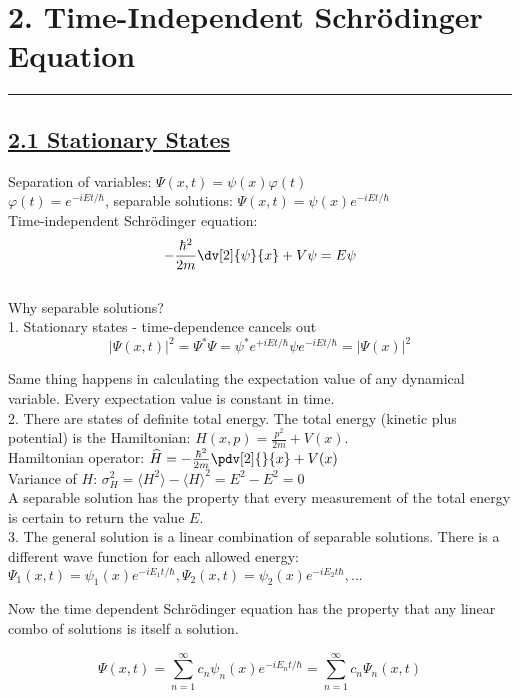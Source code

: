 \section{2. Time-Independent Schr\"{o}dinger Equation} \hrule height 0.3pt \thinspace

\subsection{\underline{2.1 Stationary States}}
Separation of variables: $\Psi(x, t) = \psi(x) \varphi(t)$ \\

$\varphi(t) = e^{-iEt/\hbar}$, separable solutions: $\Psi(x, t) = \psi(x) e^{-iEt / \hbar}$ \\

Time-independent Schr\"{o}dinger equation:
$$-\frac{\hbar^2 }{2m} \dv[2]{\psi}{x} + V \psi = E \psi $$ \\

Why separable solutions? \\
1. Stationary states - time-dependence cancels out
    $$|\Psi(x,t)|^2 = \Psi^* \Psi = \psi^* e^{+iEt/\hbar} \psi e^{-iEt/\hbar} = |\Psi(x)|^2$$

    Same thing happens in calculating the expectation value of any dynamical variable. Every expectation value is constant in time. \\

2. There are states of definite total energy. The total energy (kinetic plus potential) is the Hamiltonian: $H(x, p) = \frac{p^2}{2m} + V(x)$. \\

Hamiltonian operator: $\widehat{H} = -\frac{\hbar^2}{2m} \pdv[2]{}{x} + V(x)$ \\
Variance of $H$: $\sigma_{H}^2 = \langle H^2 \rangle - \langle H \rangle ^2 = E^2 - E^2 = 0$ \\
A separable solution has the property that every measurement of the total energy is certain to return the value $E$. \\

3. The general solution is a linear combination of separable solutions. There is a different wave function for each allowed energy: $\Psi_1(x,t) = \psi_1(x) e^{-iE_1 t / \hbar}, \Psi_2(x,t) = \psi_2 (x) e^{-iE_2 t \hbar}, ...$

Now the time dependent Schr\"{o}dinger equation has the property that any linear combo of solutions is itself a solution.

$$\Psi(x, t) = \sum_{n=1}^{\infty} c_n \psi_n(x) e^{-iE_n t / \hbar} = \sum_{n=1}^{\infty} c_n \Psi_n(x, t)$$

